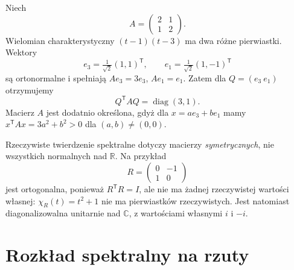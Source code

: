 \begin{przyklad}
\label{prz:lin14-real2}
Niech
\[
 A=\begin{pmatrix}2&1\\1&2\end{pmatrix}.
\]
Wielomian charakterystyczny
\((t-1)(t-3)\) ma dwa różne pierwiastki.
Wektory
\[
 e_3=\tfrac1{\sqrt2}(1,1)^{\mathsf T},
 \qquad
 e_1=\tfrac1{\sqrt2}(1,-1)^{\mathsf T}
\]
są ortonormalne i spełniają
\(Ae_3=3e_3\), \(Ae_1=e_1\).
Zatem dla \(Q=(e_3\ e_1)\)
otrzymujemy
\[
 Q^{\mathsf T}AQ=\operatorname{diag}(3,1).
\]
Macierz \(A\) jest dodatnio określona,
gdyż dla \(x=a e_3+b e_1\)
mamy
\(x^{\mathsf T}Ax=3a^2+b^2>0\)
dla \((a,b)\ne(0,0)\).
\end{przyklad}

\begin{uwaga}
\label{rem:lin14-rotation}
Rzeczywiste twierdzenie spektralne
dotyczy macierzy \emph{symetrycznych},
nie wszystkich normalnych nad \(\mathbb R\).
Na przykład
\[
 R=\begin{pmatrix}0&-1\\1&0\end{pmatrix}
\]
jest ortogonalna, ponieważ
\(R^{\mathsf T}R=I\), ale nie ma
żadnej rzeczywistej wartości własnej:
\(\chi_R(t)=t^2+1\) nie ma
pierwiastków rzeczywistych.
Jest natomiast diagonalizowalna
unitarnie nad \(\mathbb C\),
z wartościami własnymi \(i\) i \(-i\).
\end{uwaga}

\section{Rozkład spektralny na rzuty}
\label{sec:lin14-projectors}

